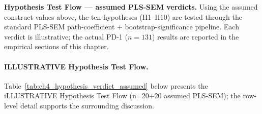 \noindent\textbf{Hypothesis Test Flow --- assumed PLS-SEM verdicts.} Using the assumed construct values above, the ten hypotheses (H1--H10) are tested through the standard PLS-SEM path-coefficient + bootstrap-significance pipeline. Each verdict is illustrative; the actual PD-1 ($n{=}131$) results are reported in the empirical sections of this chapter.

\noindent{}\vspace{4pt}

\paragraph{ILLUSTRATIVE Hypothesis Test Flow.}
\noindent Table~\ref{tab:ch4_hypothesis_verdict_assumed} below presents the iLLUSTRATIVE Hypothesis Test Flow (n=20+20 assumed PLS-SEM); the row-level detail supports the surrounding discussion.



